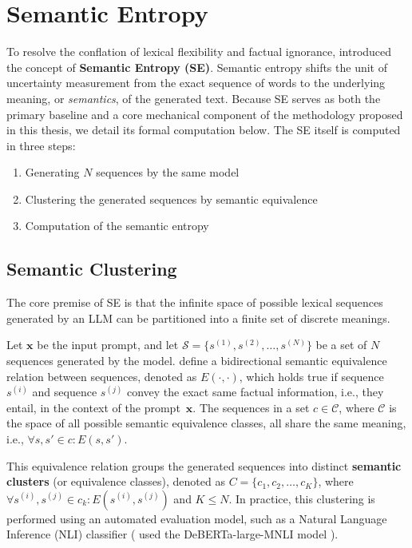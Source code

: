 \section{Semantic Entropy}
\label{sec:related_work:semantic_entropy}
To resolve the conflation of lexical flexibility and factual ignorance,
\textcite{kuhn2023semanticuncertaintylinguisticinvariances} 
introduced the concept of \textbf{Semantic Entropy (SE)}.
Semantic entropy shifts the unit of uncertainty measurement from the  
exact sequence of words to the underlying meaning, or 
\textit{semantics}, of the generated text.
Because SE serves as both the primary baseline and a core mechanical
component of the methodology proposed in this thesis, we detail its 
formal computation below. The SE itself is computed in three steps:
\begin{enumerate}
    \item Generating $N$ sequences by the same model
    \item Clustering the generated sequences by semantic equivalence
    \item Computation of the semantic entropy
\end{enumerate}


\subsection{Semantic Clustering}
\label{sec:related_work:semantic_entropy:clustering}
The core premise of SE is that the infinite space of possible lexical 
sequences generated by an LLM can be partitioned  into a finite set of 
discrete meanings.

Let $\mathbf{x}$ be the input prompt, and let $\mathcal{S} = 
\{s^{(1)}, s^{(2)}, \dots, s^{(N)}\}$ be a set of $N$ sequences 
generated by the model. 
\textcite{kuhn2023semanticuncertaintylinguisticinvariances} define a 
bidirectional semantic equivalence relation between sequences, denoted as 
$E(\cdot, \cdot)$, which holds true if sequence
$s^{(i)}$ and sequence $s^{(j)}$ convey the exact same factual 
information, i.e., they entail, in the context of the 
\hbox{prompt $\mathbf{x}$}. The sequences in a set $c \in \mathcal{C}$,
where $\mathcal{C}$ is the space of all possible semantic equivalence 
classes, all
share the same meaning, i.e., $\forall s, s' \in c: E(s, s')$.

This equivalence relation groups the generated sequences into distinct
\textbf{semantic clusters} (or equivalence classes), denoted as 
$C = \{c_1, c_2, \dots, c_K\}$, where 
\hbox{$\forall s^{(i)}, s^{(j)} \in c_k: E(s^{(i)}, s^{(j)})$} and 
$K \leq N$. 
In practice, this clustering is performed using an automated 
evaluation model, such as a Natural Language Inference (NLI) classifier
(\textcite{kuhn2023semanticuncertaintylinguisticinvariances} 
used the DeBERTa-large-MNLI model
\parencite{he2021debertadecodingenhancedbertdisentangled}).


